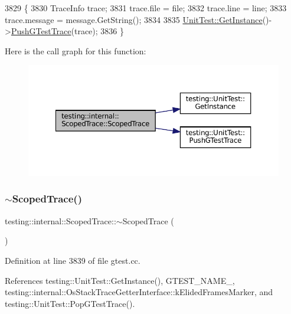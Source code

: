 \begin{DoxyCode}
3829                                           \{
3830   TraceInfo trace;
3831   trace.file = file;
3832   trace.line = line;
3833   trace.message = message.GetString();
3834 
3835   \hyperlink{classtesting_1_1UnitTest_a24192400b70b3b946746954e9574fb8e}{UnitTest::GetInstance}()->\hyperlink{classtesting_1_1UnitTest_af455b953108ff09b3b6e41011653e78a}{PushGTestTrace}(trace);
3836 \}
\end{DoxyCode}
Here is the call graph for this function\+:
\nopagebreak
\begin{figure}[H]
\begin{center}
\leavevmode
\includegraphics[width=350pt]{classtesting_1_1internal_1_1ScopedTrace_ab965d7010bbbc82c1bef6ebf8748bede_cgraph}
\end{center}
\end{figure}
\mbox{\label{classtesting_1_1internal_1_1ScopedTrace_a658c7c098ff48337058bfa2ccab65881}} 
\subsubsection{\texorpdfstring{$\sim$\+Scoped\+Trace()}{~ScopedTrace()}}
{\footnotesize\ttfamily testing\+::internal\+::\+Scoped\+Trace\+::$\sim$\+Scoped\+Trace (\begin{DoxyParamCaption}{ }\end{DoxyParamCaption})}



Definition at line 3839 of file gtest.\+cc.



References testing\+::\+Unit\+Test\+::\+Get\+Instance(), G\+T\+E\+S\+T\+\_\+\+N\+A\+M\+E\+\_\+, testing\+::internal\+::\+Os\+Stack\+Trace\+Getter\+Interface\+::k\+Elided\+Frames\+Marker, and testing\+::\+Unit\+Test\+::\+Pop\+G\+Test\+Trace().


